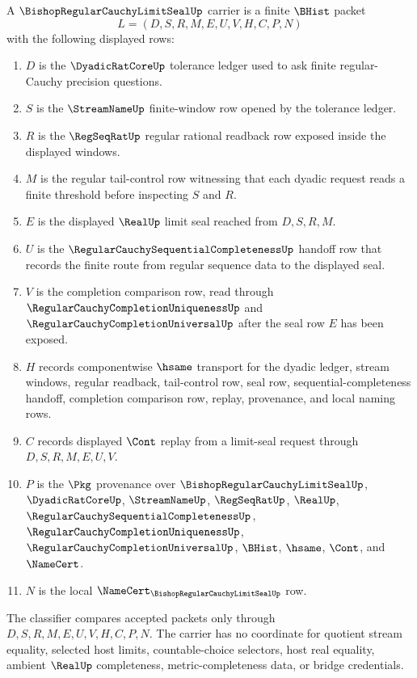 \begin{definition}
\label{def:bishop-regular-cauchy-limit-seal-carrier}
A $\BishopRegularCauchyLimitSealUp$ carrier is a finite $\BHist$ packet
$$
L=(D,S,R,M,E,U,V,H,C,P,N)
$$
with the following displayed rows:
\begin{enumerate}
\item $D$ is the $\DyadicRatCoreUp$ tolerance ledger used to ask finite regular-Cauchy precision questions.
\item $S$ is the $\StreamNameUp$ finite-window row opened by the tolerance ledger.
\item $R$ is the $\RegSeqRatUp$ regular rational readback row exposed inside the displayed windows.
\item $M$ is the regular tail-control row witnessing that each dyadic request reads a finite threshold before inspecting $S$ and $R$.
\item $E$ is the displayed $\RealUp$ limit seal reached from $D,S,R,M$.
\item $U$ is the $\RegularCauchySequentialCompletenessUp$ handoff row that records the finite route from regular sequence data to the displayed seal.
\item $V$ is the completion comparison row, read through $\RegularCauchyCompletionUniquenessUp$ and $\RegularCauchyCompletionUniversalUp$ after the seal row $E$ has been exposed.
\item $H$ records componentwise $\hsame$ transport for the dyadic ledger, stream windows, regular readback, tail-control row, seal row, sequential-completeness handoff, completion comparison row, replay, provenance, and local naming rows.
\item $C$ records displayed $\Cont$ replay from a limit-seal request through $D,S,R,M,E,U,V$.
\item $P$ is the $\Pkg$ provenance over $\BishopRegularCauchyLimitSealUp$, $\DyadicRatCoreUp$, $\StreamNameUp$, $\RegSeqRatUp$, $\RealUp$, $\RegularCauchySequentialCompletenessUp$, $\RegularCauchyCompletionUniquenessUp$, $\RegularCauchyCompletionUniversalUp$, $\BHist$, $\hsame$, $\Cont$, and $\NameCert$.
\item $N$ is the local $\NameCert_{\BishopRegularCauchyLimitSealUp}$ row.
\end{enumerate}
The classifier compares accepted packets only through $D,S,R,M,E,U,V,H,C,P,N$. The carrier has no coordinate for quotient stream equality, selected host limits, countable-choice selectors, host real equality, ambient $\RealUp$ completeness, metric-completeness data, or bridge credentials.
\end{definition}

